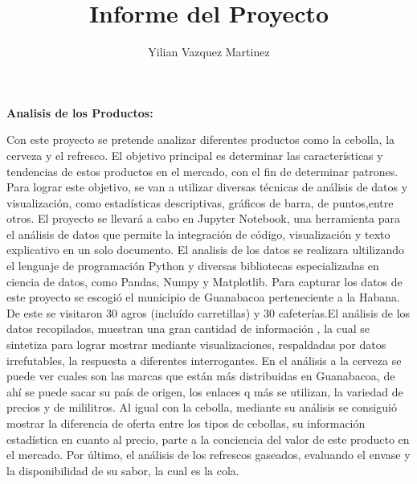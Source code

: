 \documentclass[10pt,a4paper]{article}
\begin{document}
  \title{ Informe del Proyecto}
  \author{Yilian Vazquez Martinez}
  \date{}
  \maketitle
 
  \newpage
   \textbf{ Analisis de los Productos:}
 
  Con este proyecto se pretende analizar diferentes productos como la cebolla, la cerveza y el refresco. El objetivo principal es determinar las características y tendencias de estos productos en el mercado, con el fin de determinar patrones. Para lograr este objetivo, se van a utilizar diversas técnicas de análisis de datos y visualización, como estadísticas descriptivas, gráficos de barra, de puntos,entre otros. 
  El proyecto se llevará a cabo en Jupyter Notebook, una herramienta para el análisis de datos que permite la integración de código, visualización y texto explicativo en un solo documento. El analisis de los datos se realizara ultilizando el lenguaje de programación Python y diversas bibliotecas especializadas en ciencia de datos, como Pandas, Numpy y Matplotlib.
  Para capturar los datos de este proyecto se escogió el municipio de Guanabacoa perteneciente a la Habana. De este se visitaron 30 agros (incluído carretillas) y 30 cafeterías.El análisis de los datos recopilados, muestran una gran cantidad de información , la cual se sintetiza para lograr mostrar mediante visualizaciones, respaldadas por datos irrefutables, la respuesta a diferentes interrogantes. En el análisis a la cerveza se puede ver cuales son las marcas que están más distribuidas en Guanabacoa, de ahí se puede sacar su país de origen, los enlaces q más se utilizan, la variedad de precios y de mililitros. Al igual con la cebolla, mediante su análisis se consiguió mostrar la diferencia de oferta entre los tipos de cebollas, su información estadística en cuanto al precio, parte a la conciencia del valor de este producto en el mercado. Por último, el análisis de los refrescos gaseados, evaluando el envase y la disponibilidad de su sabor, la cual es la cola.{\normalsize }
  
  
  
   
    
\end{document}
